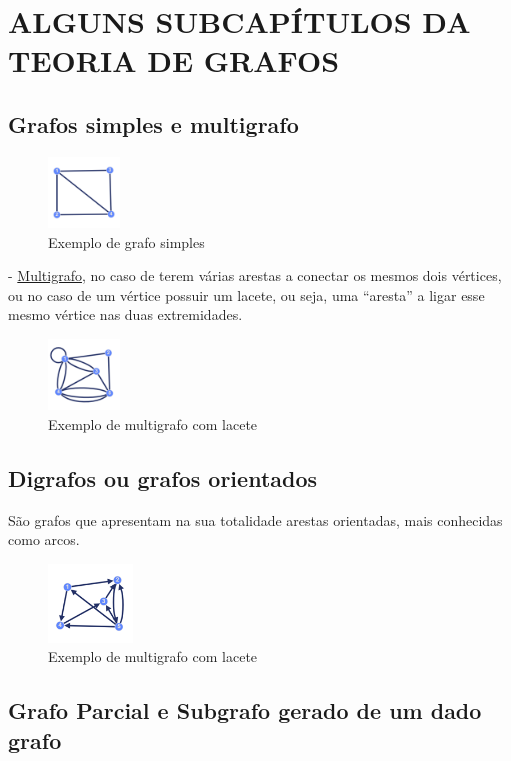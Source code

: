 \section{ALGUNS SUBCAPÍTULOS DA TEORIA DE GRAFOS}
\subsection{Grafos simples e multigrafo}
\begin{figure}[h]
    \centering
    \includegraphics[width=0.17\textwidth]{imgs/Figura3}
    \caption{Exemplo de grafo simples\label{fig:imagem3}}
\end{figure}
\linebreak
- \underline{Multigrafo}, no caso de terem várias arestas a conectar os mesmos dois vértices, ou no caso de um vértice possuir um lacete, ou seja, uma “aresta” a ligar esse mesmo vértice nas duas extremidades.
\begin{figure}[h]
    \centering
    \includegraphics[width=0.17\textwidth]{imgs/Figura4}
    \caption{Exemplo de multigrafo com lacete\label{fig:imagem4}}
\end{figure}
\linebreak
{}

\subsection{Digrafos ou grafos orientados}
São grafos que apresentam na sua totalidade arestas orientadas, mais conhecidas como arcos.
\linebreak
\begin{figure}[h]
    \centering
    \includegraphics[width=0.2\textwidth]{imgs/Figura5}
    \caption{Exemplo de multigrafo com lacete\label{fig:imagem5}}
\end{figure}

\subsection{Grafo Parcial e Subgrafo gerado de um dado grafo}
